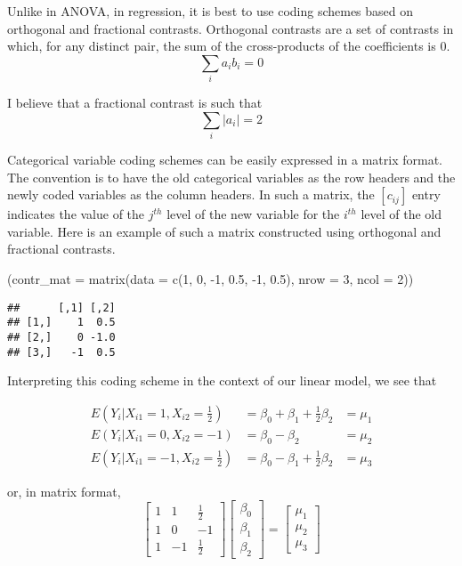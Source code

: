 \documentclass[
]{book}
\newenvironment{Shaded}{\begin{snugshade}}{\end{snugshade}}
\newcommand{\AttributeTok}[1]{\textcolor[rgb]{0.77,0.63,0.00}{#1}}
\newcommand{\DecValTok}[1]{\textcolor[rgb]{0.00,0.00,0.81}{#1}}
\newcommand{\FloatTok}[1]{\textcolor[rgb]{0.00,0.00,0.81}{#1}}
\newcommand{\FunctionTok}[1]{\textcolor[rgb]{0.00,0.00,0.00}{#1}}
\newcommand{\NormalTok}[1]{#1}
\newcommand{\SpecialCharTok}[1]{\textcolor[rgb]{0.00,0.00,0.00}{#1}}
\begin{document}
Unlike in ANOVA, in regression, it is best to use coding schemes based
on orthogonal and fractional contrasts. Orthogonal contrasts are a set
of contrasts in which, for any distinct pair, the sum of the
cross-products of the coefficients is 0.
\[
\sum_i{a_ib_i}=0
\]

I believe that a fractional contrast is such that
\[
\sum_i{|a_i|}=2
\]

Categorical variable coding schemes can be easily expressed in a matrix
format. The convention is to have the old categorical variables as the
row headers and the newly coded variables as the column headers. In such
a matrix, the \([c_{ij}]\) entry indicates the value of the \(j^{th}\) level
of the new variable for the \(i^{th}\) level of the old variable. Here is
an example of such a matrix constructed using orthogonal and fractional
contrasts.

\begin{Shaded}
\begin{Highlighting}[]
\NormalTok{(}\AttributeTok{contr\_mat =} \FunctionTok{matrix}\NormalTok{(}\AttributeTok{data =} \FunctionTok{c}\NormalTok{(}\DecValTok{1}\NormalTok{, }\DecValTok{0}\NormalTok{, }\SpecialCharTok{{-}}\DecValTok{1}\NormalTok{, }\FloatTok{0.5}\NormalTok{, }\SpecialCharTok{{-}}\DecValTok{1}\NormalTok{, }\FloatTok{0.5}\NormalTok{),}
    \AttributeTok{nrow =} \DecValTok{3}\NormalTok{, }\AttributeTok{ncol =} \DecValTok{2}\NormalTok{))}
\end{Highlighting}
\end{Shaded}

\begin{verbatim}
##      [,1] [,2]
## [1,]    1  0.5
## [2,]    0 -1.0
## [3,]   -1  0.5
\end{verbatim}

Interpreting this coding scheme in the context of our linear model, we
see that

\[
\begin{aligned}
E(Y_i|X_{i1}=1,X_{i2}=\tfrac{1}{2}) &= \beta_0+\beta_1+\tfrac{1}{2}\beta_2 &= \mu_1 \\
E(Y_i|X_{i1}=0,X_{i2}=-1) &= \beta_0-\beta_2 &= \mu_2\\
E(Y_i|X_{i1}=-1,X_{i2}=\tfrac{1}{2}) &= \beta_0-\beta_1+\tfrac{1}{2}\beta_2 &= \mu_3
\end{aligned}
\]

or, in matrix format,
\[
\begin{bmatrix}
1 & 1 & \tfrac{1}{2} \\
1 & 0 & -1 \\
1 & -1 & \tfrac{1}{2}
\end{bmatrix}
\begin{bmatrix}
\beta_0 \\
\beta_1  \\
\beta_2 
\end{bmatrix}
=
\begin{bmatrix}
\mu_1 \\
\mu_2  \\
\mu_3 
\end{bmatrix}
\]
\end{document}
